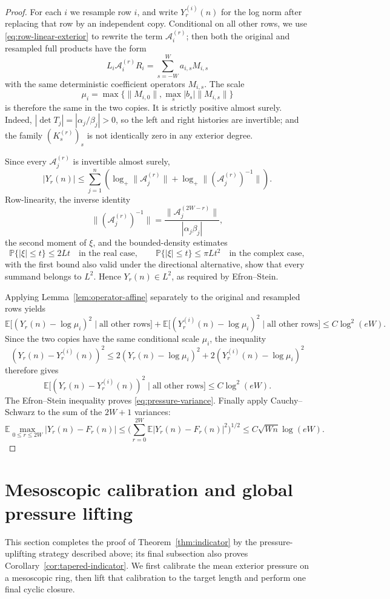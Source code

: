 \documentclass[11pt,reqno]{amsart}
\numberwithin{equation}{section}
\theoremstyle{definition}
\theoremstyle{remark}
\newcommand{\E}{\mathbb E}
\newcommand{\Pp}{\mathbb P}
\newcommand{\1}{\mathbf 1}
\begin{document}
\begin{proof}
For each $i$ we resample row $i$, and write $Y_r^{(i)}(n)$ for the log norm
after replacing that row by an independent copy.  Conditional on all other
rows, we use \eqref{eq:row-linear-exterior} to rewrite the term
$\mathcal A_i^{(r)}$; then both the original and
resampled full products have the form
\[
 L_i\mathcal A_i^{(r)}R_i
 =\sum_{s=-W}^W a_{i,s}M_{i,s}
\]
with the same deterministic coefficient operators $M_{i,s}$.  The scale
\[
 \mu_i=\max\{\|M_{i,0}\|,\max_s|b_s|\|M_{i,s}\|\}
\]
is therefore the same in the two copies.
It is strictly positive almost surely.  Indeed,
$|\det T_j|=|\alpha_j/\beta_j|>0$, so the left and right histories are
invertible; and the family $(K_s^{(r)})_s$ is not identically zero in any
exterior degree.

Since every $\mathcal A_j^{(r)}$ is invertible almost surely,
\[
 |Y_r(n)|
 \le \sum_{j=1}^n\left(
 \log_+\|\mathcal A_j^{(r)}\|
 +\log_+\|(\mathcal A_j^{(r)})^{-1}\|\right).
\]
Row-linearity, the inverse identity
\[
 \|(\mathcal A_j^{(r)})^{-1}\|
 =\frac{\|\mathcal A_j^{(2W-r)}\|}{|\alpha_j\beta_j|},
\]
the second moment of $\xi$, and the bounded-density estimates
\[
 \Pp\{|\xi|\le t\}\le 2Lt\quad\text{in the real case},
 \qquad
 \Pp\{|\xi|\le t\}\le \pi Lt^2\quad\text{in the complex case},
\]
with the first bound also valid under the directional alternative, show
that every summand belongs to
$L^2$.  Hence $Y_r(n)\in L^2$, as required by Efron--Stein.


Applying Lemma~\ref{lem:operator-affine} separately to the original and
resampled rows yields
\[
 \E\big[(Y_r(n)-\log\mu_i)^2\mid\text{all other rows}\big]
 +\E\big[(Y_r^{(i)}(n)-\log\mu_i)^2
       \mid\text{all other rows}\big]
 \le C\log^2(eW).
\]
Since the two copies have the same conditional scale $\mu_i$, the
inequality
\[
 (Y_r(n)-Y_r^{(i)}(n))^2
 \le 2(Y_r(n)-\log\mu_i)^2
     +2(Y_r^{(i)}(n)-\log\mu_i)^2
\]
therefore gives
\[
 \E\big[(Y_r(n)-Y_r^{(i)}(n))^2\mid\text{all other rows}\big]
 \le C\log^2(eW).
\]
The Efron--Stein inequality \cite{EfronStein1981} proves
\eqref{eq:pressure-variance}.  Finally apply
Cauchy--Schwarz to the sum of the $2W+1$ variances:
\[
\E\max_{0\le r\le 2W}|Y_r(n)-F_r(n)|
 \le\Big(\sum_{r=0}^{2W}\E|Y_r(n)-F_r(n)|^2\Big)^{1/2}
 \le C\sqrt{Wn}\log(eW).
\]
\end{proof}

\section{Mesoscopic calibration and global pressure lifting}
This section completes the proof of Theorem~\ref{thm:indicator} by the
pressure-uplifting strategy described above; its final subsection also
proves Corollary~\ref{cor:tapered-indicator}.  We first calibrate the mean
exterior pressure on a mesoscopic ring, then lift that calibration to the
target length and perform one final cyclic closure.
\end{document}

